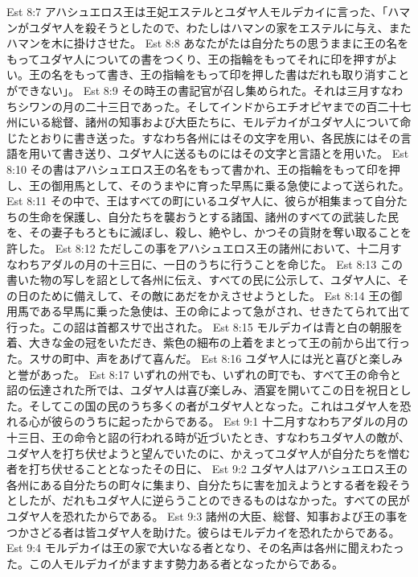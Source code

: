 Est 8:7  アハシュエロス王は王妃エステルとユダヤ人モルデカイに言った、「ハマンがユダヤ人を殺そうとしたので、わたしはハマンの家をエステルに与え、またハマンを木に掛けさせた。
Est 8:8  あなたがたは自分たちの思うままに王の名をもってユダヤ人についての書をつくり、王の指輪をもってそれに印を押すがよい。王の名をもって書き、王の指輪をもって印を押した書はだれも取り消すことができない」。
Est 8:9  その時王の書記官が召し集められた。それは三月すなわちシワンの月の二十三日であった。そしてインドからエチオピヤまでの百二十七州にいる総督、諸州の知事および大臣たちに、モルデカイがユダヤ人について命じたとおりに書き送った。すなわち各州にはその文字を用い、各民族にはその言語を用いて書き送り、ユダヤ人に送るものにはその文字と言語とを用いた。
Est 8:10  その書はアハシュエロス王の名をもって書かれ、王の指輪をもって印を押し、王の御用馬として、そのうまやに育った早馬に乗る急使によって送られた。
Est 8:11  その中で、王はすべての町にいるユダヤ人に、彼らが相集まって自分たちの生命を保護し、自分たちを襲おうとする諸国、諸州のすべての武装した民を、その妻子もろともに滅ぼし、殺し、絶やし、かつその貨財を奪い取ることを許した。
Est 8:12  ただしこの事をアハシュエロス王の諸州において、十二月すなわちアダルの月の十三日に、一日のうちに行うことを命じた。
Est 8:13  この書いた物の写しを詔として各州に伝え、すべての民に公示して、ユダヤ人に、その日のために備えして、その敵にあだをかえさせようとした。
Est 8:14  王の御用馬である早馬に乗った急使は、王の命によって急がされ、せきたてられて出て行った。この詔は首都スサで出された。
Est 8:15  モルデカイは青と白の朝服を着、大きな金の冠をいただき、紫色の細布の上着をまとって王の前から出て行った。スサの町中、声をあげて喜んだ。
Est 8:16  ユダヤ人には光と喜びと楽しみと誉があった。
Est 8:17  いずれの州でも、いずれの町でも、すべて王の命令と詔の伝達された所では、ユダヤ人は喜び楽しみ、酒宴を開いてこの日を祝日とした。そしてこの国の民のうち多くの者がユダヤ人となった。これはユダヤ人を恐れる心が彼らのうちに起ったからである。
Est 9:1  十二月すなわちアダルの月の十三日、王の命令と詔の行われる時が近づいたとき、すなわちユダヤ人の敵が、ユダヤ人を打ち伏せようと望んでいたのに、かえってユダヤ人が自分たちを憎む者を打ち伏せることとなったその日に、
Est 9:2  ユダヤ人はアハシュエロス王の各州にある自分たちの町々に集まり、自分たちに害を加えようとする者を殺そうとしたが、だれもユダヤ人に逆らうことのできるものはなかった。すべての民がユダヤ人を恐れたからである。
Est 9:3  諸州の大臣、総督、知事および王の事をつかさどる者は皆ユダヤ人を助けた。彼らはモルデカイを恐れたからである。
Est 9:4  モルデカイは王の家で大いなる者となり、その名声は各州に聞えわたった。この人モルデカイがますます勢力ある者となったからである。
